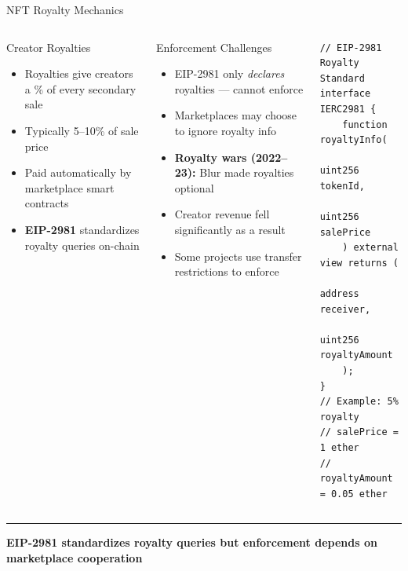 \documentclass[8pt,aspectratio=169]{beamer}
\newcommand{\bottomnote}[1]{\vfill\vspace{-2mm}\textcolor{mllavender2}{\rule{\textwidth}{0.4pt}}\vspace{1mm}\footnotesize\textbf{#1}}
\begin{document}
\begin{frame}[fragile]{NFT Royalty Mechanics}
\begin{columns}[T]
\begin{block}{Creator Royalties}
\begin{itemize}\setlength{\itemsep}{2pt}
  \item Royalties give creators a \% of every secondary sale
  \item Typically 5--10\% of sale price
  \item Paid automatically by marketplace smart contracts
  \item \textbf{EIP-2981} standardizes royalty queries on-chain
\end{itemize}
\end{block}
\vspace{3mm}
\begin{block}{Enforcement Challenges}
\begin{itemize}\setlength{\itemsep}{2pt}
  \item EIP-2981 only \textit{declares} royalties --- cannot enforce
  \item Marketplaces may choose to ignore royalty info
  \item \textbf{Royalty wars (2022--23):} Blur made royalties optional
  \item Creator revenue fell significantly as a result
  \item Some projects use transfer restrictions to enforce
\end{itemize}
\end{block}

\begin{lstlisting}[language=Solidity]
// EIP-2981 Royalty Standard
interface IERC2981 {
    function royaltyInfo(
        uint256 tokenId,
        uint256 salePrice
    ) external view returns (
        address receiver,
        uint256 royaltyAmount
    );
}
// Example: 5% royalty
// salePrice = 1 ether
// royaltyAmount = 0.05 ether
\end{lstlisting}
\end{columns}
\bottomnote{EIP-2981 standardizes royalty queries but enforcement depends on marketplace cooperation}
\end{frame}
\end{document}
